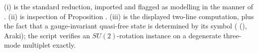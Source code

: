 (i) is the standard reduction, imported and flagged as modelling in the manner of \cite[Rem.~4.5]{ButlerT7}. (ii) is inspection of Proposition . (iii) is the displayed two-line computation, plus the fact that a gauge-invariant quasi-free state is determined by its symbol (\cite[Fact 3.3]{ButlerT7} (), Araki); the script verifies an $SU(2)$-rotation instance on a degenerate three-mode multiplet exactly.
